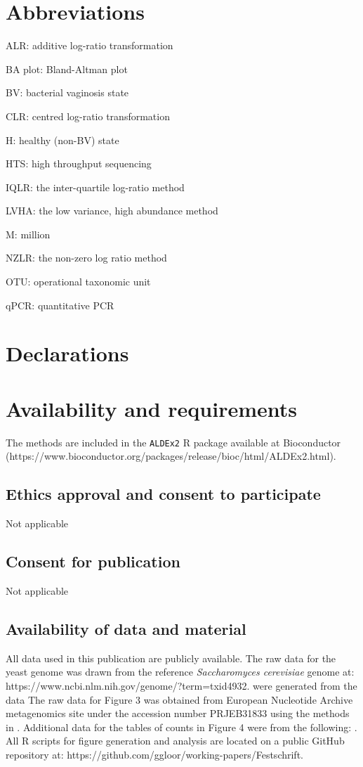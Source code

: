 \documentclass[graybox]{svmult}
\begin{document}
\section*{Abbreviations}

\noindent ALR: additive log-ratio transformation

\noindent BA plot: Bland-Altman plot

\noindent BV: bacterial vaginosis state

\noindent CLR: centred log-ratio transformation

\noindent H: healthy (non-BV) state

\noindent HTS: high throughput sequencing

\noindent IQLR: the inter-quartile log-ratio method

\noindent LVHA: the low variance, high abundance method

\noindent M: million

\noindent NZLR: the non-zero log ratio method

\noindent OTU: operational taxonomic unit

\noindent qPCR: quantitative PCR

\section*{Declarations} 

\section*{Availability and requirements}

The methods are included in the \texttt{ALDEx2} R package available at Bioconductor (https://www.bioconductor.org/packages/release/bioc/html/ALDEx2.html). 

\subsection*{Ethics approval and consent to participate}
Not applicable

\subsection*{Consent for publication}
Not applicable

\subsection*{Availability of data and material}
All data used in this publication are publicly available. The raw data for the yeast genome was drawn from the reference \textit{Saccharomyces cerevisiae} genome at: https://www.ncbi.nlm.nih.gov/genome/?term=txid4932. were generated from the data  The raw data for Figure 3 was obtained from European Nucleotide Archive metagenomics site under the accession number PRJEB31833 using  the  methods in \cite{Macklaim:2018aa}. Additional data for the tables of counts in Figure 4 were from the following: \cite{mcmurrough:2014,Gierlinski:2015aa,bian:2017}. All R scripts for figure generation and analysis are located on a public GitHub repository at: https://github.com/ggloor/working-papers/Festschrift.
\end{document}
